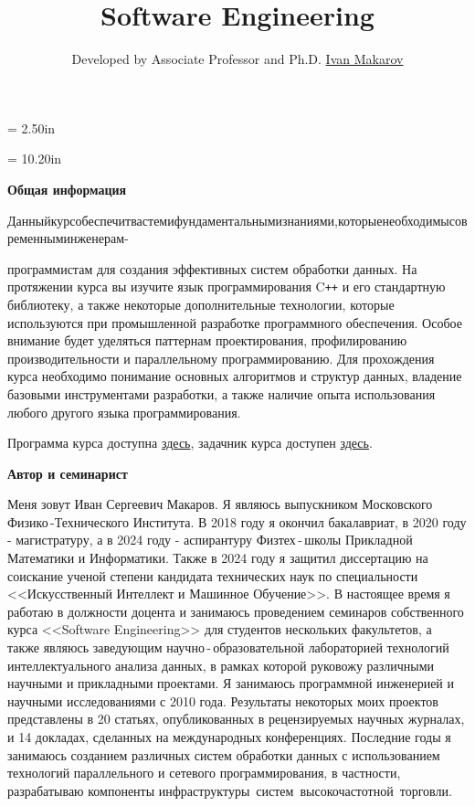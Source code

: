 \documentclass[a4paper,12pt]{article}
\begin{document}
\newpage\thispagestyle{empty}\pdfpageheight = 2.50in\enlargethispage{100in}

\title{\bf Software Engineering}

\author{Developed by Associate Professor and Ph.D. \href{https://t.me/i_s_m_mipt}{Ivan Makarov}}

\date{}

\maketitle



\newpage\thispagestyle{empty}\pdfpageheight = 10.20in\enlargethispage{100in}

\textbf{Общая информация}

\medskip

Данный\:курс\:обеспечит\:вас\:теми\:фундаментальными\:знаниями,\:которые\:необходимы\:современным\:инженерам-

программистам для создания эффективных систем обработки данных. На протяжении курса вы изучите язык программирования C\texttt{++} и его стандартную библиотеку, а также некоторые дополнительные технологии, которые используются при промышленной разработке программного обеспечения. Особое внимание будет уделяться паттернам проектирования, профилированию производительности и параллельному программированию. Для прохождения курса необходимо понимание основных алгоритмов и структур данных, владение базовыми инструментами разработки, а также наличие опыта использования любого другого языка программирования.

\medskip

Программа курса доступна \href{https://github.com/i-s-m-mipt/Education/blob/master/materials.pdf}{здесь}, задачник курса доступен \href{https://github.com/i-s-m-mipt/Education/blob/master/problems.pdf}{здесь}.

\bigskip

\textbf{Автор и семинарист}

\medskip

Меня зовут Иван Сергеевич Макаров. Я являюсь выпускником Московского Физико\,-Технического Института. В 2018 году я окончил бакалавриат, в 2020 году - магистратуру, а в 2024 году - аспирантуру Физтех\,-\,школы Прикладной Математики и Информатики. Также в 2024 году я защитил диссертацию на соискание ученой степени кандидата технических наук по специальности <<Искусственный Интеллект и Машинное Обучение>>. В настоящее время я работаю в должности доцента и занимаюсь проведением семинаров собственного курса <<Software Engineering>> для студентов нескольких факультетов, а также являюсь заведующим научно\,-\,образовательной лабораторией технологий интеллектуального анализа данных, в рамках которой руковожу различными научными и прикладными проектами. Я занимаюсь программной инженерией и научными исследованиями с 2010 года. Результаты некоторых моих проектов представлены в 20 статьях, опубликованных в рецензируемых научных журналах, и 14 докладах, сделанных на международных конференциях. Последние годы я занимаюсь созданием различных систем обработки данных с использованием технологий параллельного и сетевого программирования, в частности, разрабатываю компоненты инфраструктуры~систем~высокочастотной~торговли.
\end{document}
